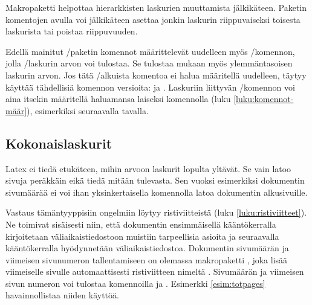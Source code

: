 Makropaketti  helpottaa
hierarkkisten laskurien muuttamista jälkikäteen. Paketin komentojen
avulla voi jälkikäteen asettaa jonkin laskurin riippuvaiseksi toisesta
laskurista tai poistaa riippuvuuden.

\begin{koodilohkosis}
\end{koodilohkosis}

Edellä mainitut \-/paketin komennot määrittelevät
uudelleen myös \-/komennon, jolla
\-/laskurin arvon voi tulostaa. Se tulostaa mukaan myös
ylemmäntasoisen laskurin arvon. Jos tätä \-/alkuista
komentoa ei halua määritellä uudelleen, täytyy käyttää tähdellisiä
komennon versioita:  ja . Laskuriin liittyvän \-/komennon
voi aina itsekin määritellä haluamansa laiseksi komennolla  (luku \ref{luku:komennot-määr}), esimerkiksi seuraavalla
tavalla.

\begin{koodilohkosis}
  \renewcommand{\theoma}{\arabic{page}/\alph{oma}}
\end{koodilohkosis}

\subsection{Kokonaislaskurit}

Latex ei tiedä etukäteen, mihin arvoon laskurit lopulta yltävät. Se vain
latoo sivuja peräkkäin eikä tiedä mitään tulevasta. Sen vuoksi
esimerkiksi dokumentin sivumäärää ei voi ihan yksinkertaisella
komennolla latoa dokumentin alkusivuille.

Vastaus tämäntyyppisiin ongelmiin löytyy ristiviitteistä (luku
\ref{luku:ristiviitteet}). Ne toimivat sisäisesti niin, että dokumentin
ensimmäisellä kääntökerralla kirjoitetaan väliaikaistiedostoon muistiin
tarpeellisia asioita ja seuraavalla kääntökerralla hyödynnetään
väliaikaistiedostoa. Dokumentin sivumäärän ja viimeisen sivunumeron
tallentamiseen on olemassa makropaketti , joka lisää
viimeiselle sivulle automaattisesti ristiviitteen nimeltä
. Sivumäärän ja viimeisen sivun numeron voi tulostaa
komennoilla  ja . Esimerkki
\ref{esim:totpages} havainnollistaa niiden käyttöä.

